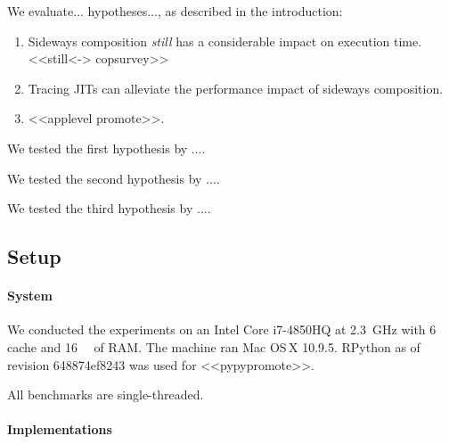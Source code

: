 \documentclass[preprint,english,10pt,nonatbib]{sigplanconf}
\begin{document}
\def\idBox#1#2{%
\setlength{\fboxsep}{1pt}%
\colorbox[HTML]{#1}{\textcolor[gray]{0.9}{\rule[0.1pt]{0pt}{5pt}#2}}%
\xspace}



We evaluate... hypotheses..., as described in the introduction:
\begin{enumerate}
\item Sideways composition \emph{still} has a considerable impact on execution
  time. <<still<-> copsurvey>>
\item Tracing JITs can alleviate the performance impact of sideways composition.
\item <<applevel promote>>.
\end{enumerate}



We tested the first hypothesis by ....

We tested the second hypothesis by ....

We tested the third hypothesis by ....


\subsection{Setup}
\label{sec:setup}


\paragraph{System} We conducted the experiments on %
an Intel Core i7-4850HQ at \SI{2.3}{\GHz} with \SI{6}{\mega\byte} cache and
\SI{16}{\giga\byte} of RAM. The machine ran Mac OS\,X 10.9.5.
%
RPython as of revision
648874ef8243
 was used for <<pypypromote>>.

All benchmarks are single-threaded.


\paragraph{Implementations} %
\end{document}
